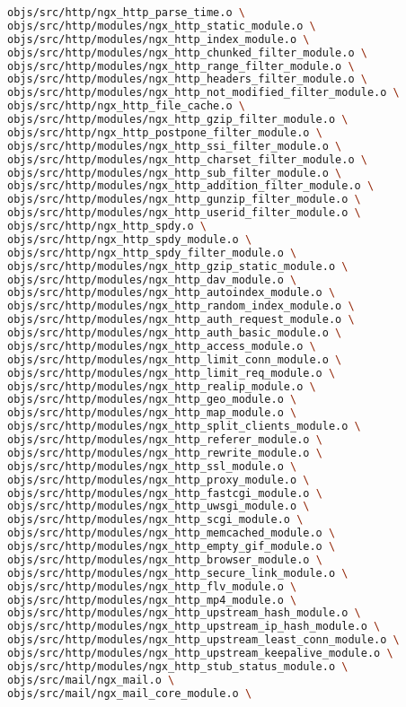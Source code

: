 \begin{lstlisting}[language=bash]
objs/src/http/ngx_http_parse_time.o \
objs/src/http/modules/ngx_http_static_module.o \
objs/src/http/modules/ngx_http_index_module.o \
objs/src/http/modules/ngx_http_chunked_filter_module.o \
objs/src/http/modules/ngx_http_range_filter_module.o \
objs/src/http/modules/ngx_http_headers_filter_module.o \
objs/src/http/modules/ngx_http_not_modified_filter_module.o \
objs/src/http/ngx_http_file_cache.o \
objs/src/http/modules/ngx_http_gzip_filter_module.o \
objs/src/http/ngx_http_postpone_filter_module.o \
objs/src/http/modules/ngx_http_ssi_filter_module.o \
objs/src/http/modules/ngx_http_charset_filter_module.o \
objs/src/http/modules/ngx_http_sub_filter_module.o \
objs/src/http/modules/ngx_http_addition_filter_module.o \
objs/src/http/modules/ngx_http_gunzip_filter_module.o \
objs/src/http/modules/ngx_http_userid_filter_module.o \
objs/src/http/ngx_http_spdy.o \
objs/src/http/ngx_http_spdy_module.o \
objs/src/http/ngx_http_spdy_filter_module.o \
objs/src/http/modules/ngx_http_gzip_static_module.o \
objs/src/http/modules/ngx_http_dav_module.o \
objs/src/http/modules/ngx_http_autoindex_module.o \
objs/src/http/modules/ngx_http_random_index_module.o \
objs/src/http/modules/ngx_http_auth_request_module.o \
objs/src/http/modules/ngx_http_auth_basic_module.o \
objs/src/http/modules/ngx_http_access_module.o \
objs/src/http/modules/ngx_http_limit_conn_module.o \
objs/src/http/modules/ngx_http_limit_req_module.o \
objs/src/http/modules/ngx_http_realip_module.o \
objs/src/http/modules/ngx_http_geo_module.o \
objs/src/http/modules/ngx_http_map_module.o \
objs/src/http/modules/ngx_http_split_clients_module.o \
objs/src/http/modules/ngx_http_referer_module.o \
objs/src/http/modules/ngx_http_rewrite_module.o \
objs/src/http/modules/ngx_http_ssl_module.o \
objs/src/http/modules/ngx_http_proxy_module.o \
objs/src/http/modules/ngx_http_fastcgi_module.o \
objs/src/http/modules/ngx_http_uwsgi_module.o \
objs/src/http/modules/ngx_http_scgi_module.o \
objs/src/http/modules/ngx_http_memcached_module.o \
objs/src/http/modules/ngx_http_empty_gif_module.o \
objs/src/http/modules/ngx_http_browser_module.o \
objs/src/http/modules/ngx_http_secure_link_module.o \
objs/src/http/modules/ngx_http_flv_module.o \
objs/src/http/modules/ngx_http_mp4_module.o \
objs/src/http/modules/ngx_http_upstream_hash_module.o \
objs/src/http/modules/ngx_http_upstream_ip_hash_module.o \
objs/src/http/modules/ngx_http_upstream_least_conn_module.o \
objs/src/http/modules/ngx_http_upstream_keepalive_module.o \
objs/src/http/modules/ngx_http_stub_status_module.o \
objs/src/mail/ngx_mail.o \
objs/src/mail/ngx_mail_core_module.o \

\end{lstlisting}
